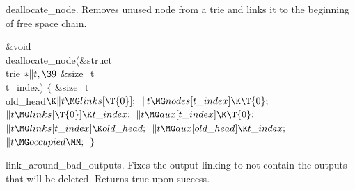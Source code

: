 deallocate\_node.
Removes unused node from a trie and links it to the beginning of free space
chain.

\Y\B\1\1\&{void} \\{deallocate\_node}(\&{struct} \\{trie} ${}{*}\|t,\39{}$%
\&{size\_t} \\{t\_index})\2\2\6
${}\{{}$\1\6
\&{size\_t} \\{old\_head}${}\K\|t\MG\\{links}[\T{0}];{}$\7
${}\|t\MG\\{nodes}[\\{t\_index}]\K\T{0};{}$\6
${}\|t\MG\\{links}[\T{0}]\K\\{t\_index};{}$\6
${}\|t\MG\\{aux}[\\{t\_index}]\K\T{0};{}$\6
${}\|t\MG\\{links}[\\{t\_index}]\K\\{old\_head};{}$\6
${}\|t\MG\\{aux}[\\{old\_head}]\K\\{t\_index};{}$\6
${}\|t\MG\\{occupied}\MM;{}$\6
\4${}\}{}$\2\par
\fi

link\_around\_bad\_outputs.
Fixes the output linking to not contain the outputs that will be deleted.
Returns true upon success.


